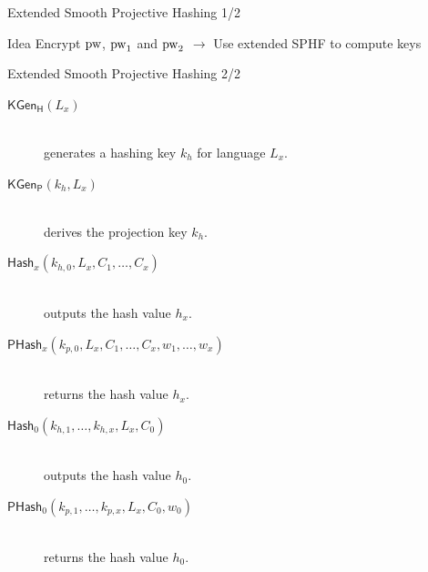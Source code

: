 \documentclass[notes,xcolor=dvipsnames]{beamer}
\begin{document}
\begin{frame}{Extended Smooth Projective Hashing 1/2}


\begin{figure}
\end{figure}

%
%
\begin{beamerboxesrounded}[upper=uppercol,lower=lowercol,shadow=true]{\centering Idea}
	Encrypt $\mathrm{pw}$, $\mathrm{pw}_1$ and $\mathrm{pw}_2$ $\rightarrow$ Use extended SPHF to compute keys
\end{beamerboxesrounded}

\end{frame}

\begin{frame}{Extended Smooth Projective Hashing 2/2}

\begin{description}
	\item[$\mathsf{KGen_H}(L_x)$]\hfill\\ generates a hashing key $k_h$ for language $L_x$.
	\item[$\mathsf{KGen_P}(k_h,L_x)$]\hfill\\ derives the projection key $k_h$.
	\item[$\mathsf{Hash}_x (k_{h,0},L_x,C_1,\dots,C_x)$]\hfill\\ outputs the hash value $h_x$.
	\item[$\mathsf{PHash}_x (k_{p,0},L_x,C_1,\dots,C_x,w_1,\dots,w_x)$]\hfill\\ returns the hash value $h_x$.
	\item[$\mathsf{Hash}_0(k_{h,1},\dots,k_{h,x},L_x,C_0)$]\hfill\\ outputs the hash value $h_0$.
	\item[$\mathsf{PHash}_0(k_{p,1},\dots,k_{p,x},L_x,C_0,w_0)$]\hfill\\ returns the hash value $h_0$.
\end{description}

\end{frame}
\end{document}
